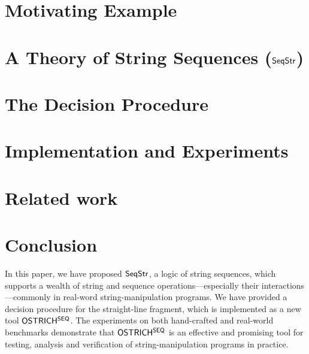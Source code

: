 \documentclass{llncs}
\begin{document}


\section{Motivating Example} \label{sect:example}



\section{A Theory of String Sequences (${\sf SeqStr}$)}\label{sec:logic}



\section{The Decision Procedure} \label{sect:procedure}




\section{Implementation and Experiments} \label{sect:exp}




\section{Related work}\label{sect:related}




\section{Conclusion} \label{sect:conc}

In this paper, we have proposed ${\sf SeqStr}$, a logic of string sequences, which supports a wealth of string and sequence operations---especially their interactions---commonly in real-word string-manipulation programs. We have provided a decision procedure for the straight-line fragment, which is implemented as a new tool ${\sf OSTRICH^{SEQ}}$. The experiments on both hand-crafted and real-world benchmarks demonstrate that ${\sf OSTRICH^{SEQ}}$ is an effective and promising tool for testing, analysis and verification of string-manipulation programs in practice. 
\end{document}
